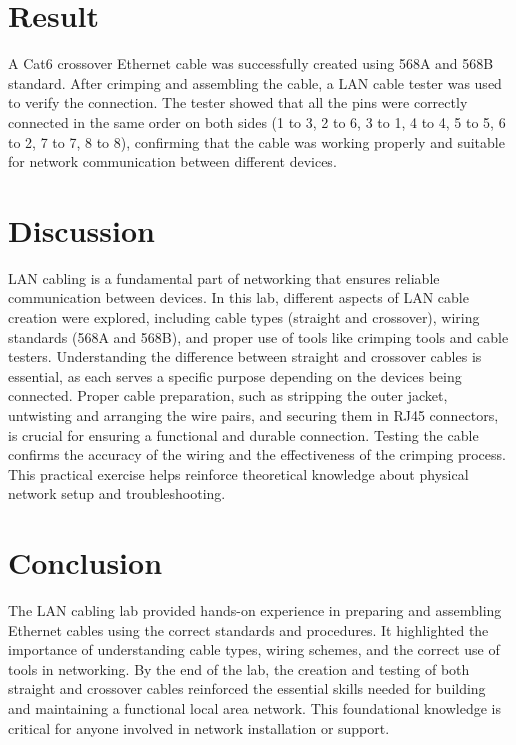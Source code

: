 \documentclass[a4paper]{article}
\begin{document}
\section{Result}
A Cat6 crossover Ethernet cable was successfully created using 568A and 568B standard. After crimping and assembling the cable, a LAN cable tester was used to verify the connection. The tester showed that all the pins were correctly connected in the same order on both sides (1 to 3, 2 to 6, 3 to 1, 4 to 4, 5 to 5, 6 to 2, 7 to 7, 8 to 8), confirming that the cable was working properly and suitable for network communication between different devices.
\section{Discussion}
LAN cabling is a fundamental part of networking that ensures reliable communication between devices. In this lab, different aspects of LAN cable creation were explored, including cable types (straight and crossover), wiring standards (568A and 568B), and proper use of tools like crimping tools and cable testers. Understanding the difference between straight and crossover cables is essential, as each serves a specific purpose depending on the devices being connected. Proper cable preparation, such as stripping the outer jacket, untwisting and arranging the wire pairs, and securing them in RJ45 connectors, is crucial for ensuring a functional and durable connection. Testing the cable confirms the accuracy of the wiring and the effectiveness of the crimping process. This practical exercise helps reinforce theoretical knowledge about physical network setup and troubleshooting.
\section{Conclusion}
The LAN cabling lab provided hands-on experience in preparing and assembling Ethernet cables using the correct standards and procedures. It highlighted the importance of understanding cable types, wiring schemes, and the correct use of tools in networking. By the end of the lab, the creation and testing of both straight and crossover cables reinforced the essential skills needed for building and maintaining a functional local area network. This foundational knowledge is critical for anyone involved in network installation or support.
\end{document}
